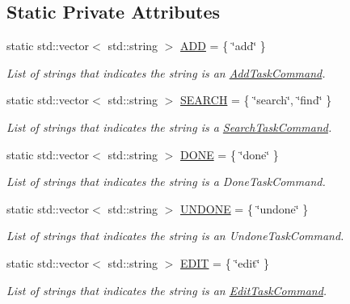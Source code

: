 \subsection*{Static Private Attributes}
\begin{DoxyCompactItemize}
\item 
static std\+::vector$<$ std\+::string $>$ \hyperlink{class_do_lah_1_1_command_parser_a1c73df26d5ef75f3bf8a175848c9c309}{A\+D\+D} = \{ \char`\"{}add\char`\"{} \}
\begin{DoxyCompactList}\small\item\em List of strings that indicates the string is an \hyperlink{class_do_lah_1_1_add_task_command}{Add\+Task\+Command}. \end{DoxyCompactList}\item 
static std\+::vector$<$ std\+::string $>$ \hyperlink{class_do_lah_1_1_command_parser_a2681caa42d19e5e414a54288ee705317}{S\+E\+A\+R\+C\+H} = \{ \char`\"{}search\char`\"{}, \char`\"{}find\char`\"{} \}
\begin{DoxyCompactList}\small\item\em List of strings that indicates the string is a \hyperlink{class_do_lah_1_1_search_task_command}{Search\+Task\+Command}. \end{DoxyCompactList}\item 
static std\+::vector$<$ std\+::string $>$ \hyperlink{class_do_lah_1_1_command_parser_a225369acfd527549bda2420ae7528987}{D\+O\+N\+E} = \{ \char`\"{}done\char`\"{} \}
\begin{DoxyCompactList}\small\item\em List of strings that indicates the string is a Done\+Task\+Command. \end{DoxyCompactList}\item 
static std\+::vector$<$ std\+::string $>$ \hyperlink{class_do_lah_1_1_command_parser_ad58f7d1620e3c60fc85850183804443a}{U\+N\+D\+O\+N\+E} = \{ \char`\"{}undone\char`\"{} \}
\begin{DoxyCompactList}\small\item\em List of strings that indicates the string is an Undone\+Task\+Command. \end{DoxyCompactList}\item 
static std\+::vector$<$ std\+::string $>$ \hyperlink{class_do_lah_1_1_command_parser_ae978394933fd0c4fb2bc7d1010e401ff}{E\+D\+I\+T} = \{ \char`\"{}edit\char`\"{} \}
\begin{DoxyCompactList}\small\item\em List of strings that indicates the string is an \hyperlink{class_do_lah_1_1_edit_task_command}{Edit\+Task\+Command}. \end{DoxyCompactList}\item 

\end{DoxyCompactItemize}
